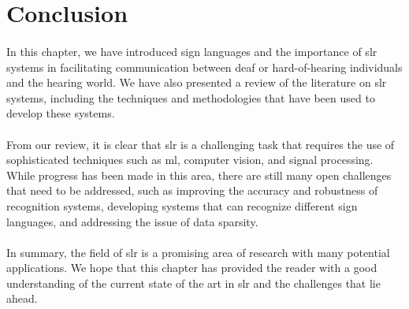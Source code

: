 \section{Conclusion}
\paragraph{}
In this chapter, we have introduced sign languages and the importance of \ac{slr} systems in facilitating communication between deaf or hard-of-hearing individuals and the hearing world. We have also presented a review of the literature on \ac{slr} systems, including the techniques and methodologies that have been used to develop these systems.
\paragraph{}
From our review, it is clear that \ac{slr} is a challenging task that requires the use of sophisticated techniques such as \ac{ml}, computer vision, and signal processing. While progress has been made in this area, there are still many open challenges that need to be addressed, such as improving the accuracy and robustness of recognition systems, developing systems that can recognize different sign languages, and addressing the issue of data sparsity.
\paragraph{}
In summary, the field of \ac{slr} is a promising area of research with many potential applications. We hope that this chapter has provided the reader with a good understanding of the current state of the art in \ac{slr} and the challenges that lie ahead.